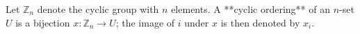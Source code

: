 Let $\mathbb{Z}_n$ denote the cyclic group with $n$ elements. A **cyclic ordering** of an $n$-set $U$ is a bijection $x: \mathbb{Z}_n \to U$; the image of $i$ under $x$ is then denoted by $x_i$.

